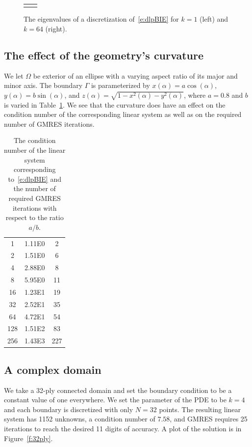 \documentclass[final]{siamltex}
\begin{document}
\begin{figure}[htps]
\centering
\begin{tabular}{cc}
 &

\end{tabular}
\caption{\label{f:evalues} The eigenvalues of a discretization
of~\eqref{e:dlpBIE} for $k=1$ (left) and $k=64$ (right).}
\end{figure}


\subsection{The effect of the geometry's curvature}
We let $\Omega$ be exterior of an ellipse with a varying aspect ratio of
its major and minor axis.  The boundary $\Gamma$ is parameterized by
$x(\alpha) = a\cos(\alpha)$, $y(\alpha) = b\sin(\alpha)$, and $z(\alpha)
= \sqrt{1-x^{2}(\alpha)-y^{2}(\alpha)}$, where $a = 0.8$ and $b$ is
varied in Table~\ref{t:example3}.  We see that the curvature does have
an effect on the condition number of the corresponding linear system as
well as on the required number of GMRES iterations.

\begin{table}[htps]
\centering
\begin{tabular}{c>{\centering}m{2cm}c}
\hline
1   & 1.11E0 & 2   \\ 
2   & 1.51E0 & 6   \\
4   & 2.88E0 & 8   \\
8   & 5.95E0 & 11  \\
16  & 1.23E1 & 19  \\
32  & 2.52E1 & 35  \\
64  & 4.72E1 & 54  \\
128 & 1.51E2 & 83  \\
256 & 1.43E3 & 227 \\
\end{tabular}
\caption{\label{t:example3} The condition number of the linear system
corresponding to~\eqref{e:dlpBIE} and the number of required GMRES
iterations with respect to the ratio $a/b$.}
\end{table}


\subsection*{A complex domain}
We take a 32-ply connected domain and set the boundary condition to be a
constant value of one everywhere.  We set the parameter of the PDE to be
$k=4$ and each boundary is discretized with only $N=32$ points.  The
resulting linear system has 1152 unknowns, a condition number of $7.58$,
and GMRES requires 25 iterations to reach the desired 11 digits of
accuracy.  A plot of the solution is in Figure~\ref{f:32ply}.
\end{document}
